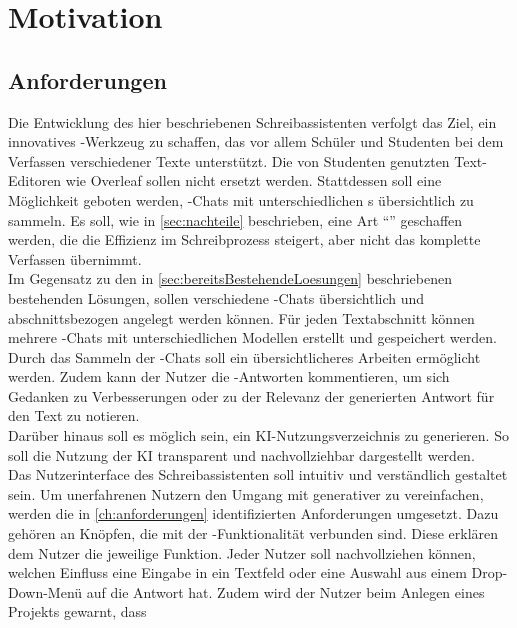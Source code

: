 \documentclass[../main.tex]{subfiles}
\begin{document}
\section{Motivation}

\subsection{Anforderungen}


Die Entwicklung des hier beschriebenen Schreibassistenten verfolgt das Ziel, ein innovatives -Werkzeug zu schaffen, das vor allem Schüler und Studenten bei dem Verfassen 
verschiedener Texte unterstützt. Die von Studenten genutzten Text-Editoren wie Overleaf sollen nicht ersetzt werden. Stattdessen soll eine Möglichkeit geboten werden, 
-Chats mit unterschiedlichen s übersichtlich zu sammeln. Es soll, wie in \autoref{sec:nachteile} beschrieben, eine Art "`"' geschaffen werden, die die Effizienz im Schreibprozess 
steigert, aber nicht das komplette Verfassen übernimmt.\\ Im Gegensatz zu den in \autoref{sec:bereitsBestehendeLoesungen} beschriebenen bestehenden Lösungen, sollen verschiedene -Chats 
übersichtlich und abschnittsbezogen angelegt werden können. Für jeden Textabschnitt können mehrere -Chats mit unterschiedlichen Modellen erstellt und gespeichert werden. Durch das Sammeln 
der -Chats soll ein übersichtlicheres Arbeiten ermöglicht werden. Zudem kann der Nutzer die -Antworten kommentieren, um sich Gedanken zu Verbesserungen oder zu der Relevanz der generierten Antwort für den Text zu notieren.\\
Darüber hinaus soll es möglich sein, ein KI-Nutzungsverzeichnis zu generieren. So soll die Nutzung der KI transparent und nachvollziehbar dargestellt werden.\\
Das Nutzerinterface des Schreibassistenten soll intuitiv und verständlich gestaltet sein. Um unerfahrenen Nutzern den Umgang mit 
generativer  zu vereinfachen, werden die in \autoref{ch:anforderungen} identifizierten Anforderungen umgesetzt. Dazu gehören  an Knöpfen, die mit der 
-Funktionalität verbunden sind. Diese erklären dem Nutzer die jeweilige Funktion. Jeder Nutzer soll nachvollziehen können, welchen Einfluss eine Eingabe in 
ein Textfeld oder eine Auswahl aus einem Drop-Down-Menü auf die Antwort hat. Zudem wird der Nutzer beim Anlegen eines Projekts gewarnt, dass 
\end{document}
